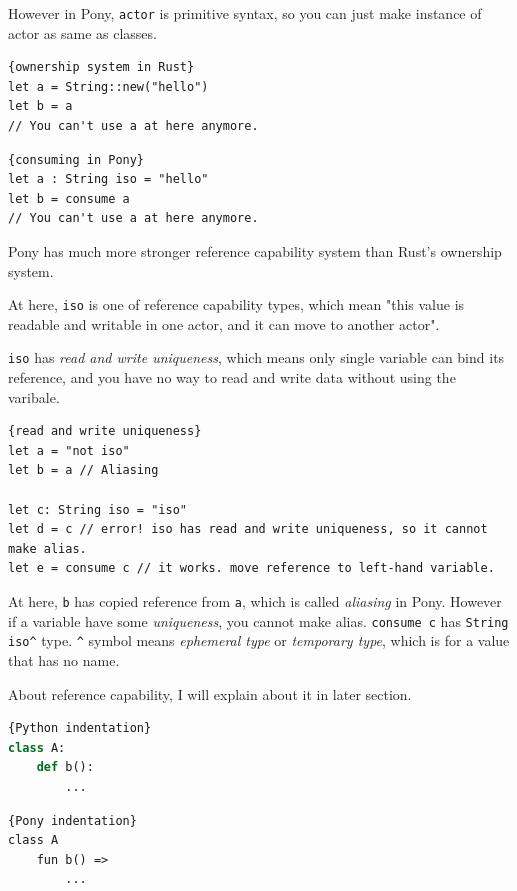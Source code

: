 \documentclass{article}
\begin{document}
\begin{multicols}{2}
However in Pony, \texttt{actor} is primitive syntax, so you can just make instance of actor as same as classes. \\





\begin{lstlisting}{ownership system in Rust}
let a = String::new("hello")
let b = a
// You can't use a at here anymore.
\end{lstlisting}

\begin{lstlisting}{consuming in Pony}
let a : String iso = "hello"
let b = consume a
// You can't use a at here anymore.
\end{lstlisting}

Pony has much more stronger reference capability system than Rust's ownership system. 

At here, \texttt{iso} is one of reference capability types, which mean "this value is readable and writable in one actor, and it can move to another actor".

\texttt{iso} has \textit{read and write uniqueness}, which means only single variable can bind its reference, and you have no way to read and write data without using the varibale.

\begin{lstlisting}{read and write uniqueness}
let a = "not iso"
let b = a // Aliasing

let c: String iso = "iso"
let d = c // error! iso has read and write uniqueness, so it cannot make alias.
let e = consume c // it works. move reference to left-hand variable. 
\end{lstlisting}
At here, \texttt{b} has copied reference from \texttt{a}, which is called \textit{aliasing} in Pony. However if a variable have some \textit{uniqueness}, you cannot make alias. \texttt{consume c} has \texttt{String iso\^} type. \texttt{\^} symbol means \textit{ephemeral type} or \textit{temporary type}, which is for a value that has no name.

About reference capability, I will explain about it in later section.
\\



\begin{lstlisting}[language=Python]{Python indentation}
class A:
	def b():
		...
\end{lstlisting}

\begin{lstlisting}{Pony indentation}
class A
	fun b() =>
		...
\end{lstlisting}



\end{multicols}
\end{document}

